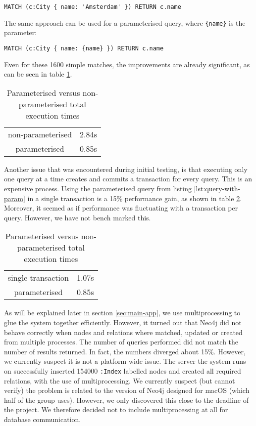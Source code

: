 \begin{lstlisting}[language=cypher, caption={Matching cities without parameterising}, label={lst:query-non-param}]
MATCH (c:City { name: 'Amsterdam' }) RETURN c.name
\end{lstlisting}

The same approach can be used for a parameterised query, where \texttt{\{name\}} is the parameter:
\begin{lstlisting}[language=cypher, caption={Matching cities without parameterising}, label={lst:query-with-param}]
MATCH (c:City { name: {name} }) RETURN c.name
\end{lstlisting}

Even for these 1600 simple matches, the improvements are already significant, as can be seen in table \ref{tbl:param-improvement}.
\begin{table}[H]
\centering
\begin{tabular}{|c|c|}
    \hline
    non-parameterised & 2.84s \\
    parameterised & 0.85s\\
    \hline
\end{tabular}
\caption{Parameterised versus non-parameterised total execution times}
\label{tbl:param-improvement}
\end{table}

Another issue that was encountered during initial testing, is that executing only one query at a time creates and commits a transaction for every query. This is an expensive process. Using the parameterised query from listing \ref{lst:query-with-param} in a single transaction is a 15\% performance gain, as shown in table \ref{tbl:bulk-improvement}. Moreover, it seemed as if performance was fluctuating with a transaction per query. However, we have not bench marked this.
\begin{table}[H]
\centering
\begin{tabular}{|c|c|}
    \hline
    single transaction & 1.07s \\
    parameterised & 0.85s\\
    \hline
\end{tabular}
\caption{Parameterised versus non-parameterised total execution times}
\label{tbl:bulk-improvement}
\end{table}

As will be explained later in section \ref{sec:main-app}, we use multiprocessing to glue the system together efficiently. However, it turned out that Neo4j did not behave correctly when nodes and relations where matched, updated or created from multiple processes. The number of queries performed did not match the number of results returned. In fact, the numbers diverged about 15\%. However, we currently suspect it is not a platform-wide issue. The server the system runs on successfully inserted 154000 \texttt{:Index} labelled nodes and created all required relations, with the use of multiprocessing. We currently suspect (but cannot verify) the problem is related to the version of Neo4j designed for macOS (which half of the group uses). However, we only discovered this close to the deadline of the project. We therefore decided not to include multiprocessing at all for database communication.
